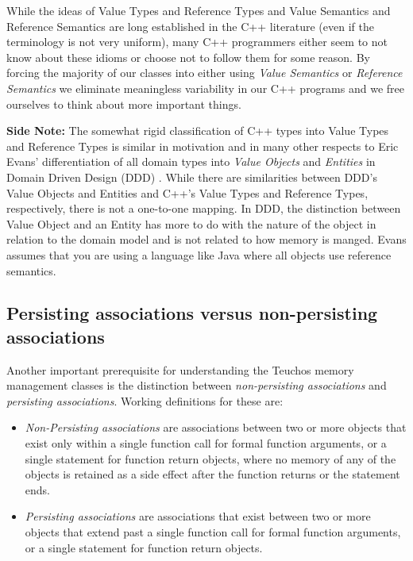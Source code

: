 \documentclass[pdf,ps2pdf,11pt]{SANDreport}
\begin{document}
While the ideas of Value Types and Reference Types and Value Semantics
and Reference Semantics are long established in the C++ literature
(even if the terminology is not very uniform), many C++ programmers
either seem to not know about these idioms or choose not to follow them
for some reason.  By forcing the majority of our classes into either
using {}\textit{Value Semantics} or {}\textit{Reference Semantics} we
eliminate meaningless variability in our C++ programs and we free
ourselves to think about more important things.

{}\textbf{Side Note:} The somewhat rigid classification of C++ types
into Value Types and Reference Types is similar in motivation and in
many other respects to Eric Evans' differentiation of all domain types
into {}\textit{Value Objects} and {}\textit{Entities} in Domain Driven
Design (DDD) {}\cite{DomainDrivenDesign}.  While there are
similarities between DDD's Value Objects and Entities and C++'s Value
Types and Reference Types, respectively, there is not a one-to-one
mapping.  In DDD, the distinction between Value Object and an Entity
has more to do with the nature of the object in relation to the domain
model and is not related to how memory is manged.  Evans assumes that
you are using a language like Java where all objects use reference
semantics.


%
{}\subsection{Persisting associations versus non-persisting associations}
\label{sec:persisting-nonpersisting-associations}
%

Another important prerequisite for understanding the Teuchos memory
management classes is the distinction between {}\textit{non-persisting
associations} and {}\textit{persisting associations}.  Working
definitions for these are:

\begin{itemize}

{}\item\textit{Non-Persisting associations} are associations between
two or more objects that exist only within a single function call for
formal function arguments, or a single statement for function return
objects, where no memory of any of the objects is retained as a side
effect after the function returns or the statement ends.

{}\item\textit{Persisting associations} are associations that exist
between two or more objects that extend past a single function call
for formal function arguments, or a single statement for function
return objects.

\end{itemize}
\end{document}
